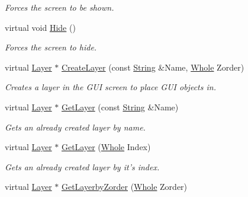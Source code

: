 \begin{DoxyCompactItemize}
\begin{DoxyCompactList}\small\item\em Forces the screen to be shown. \item\end{DoxyCompactList}\item 
\hypertarget{classphys_1_1UI_1_1Screen_acd02862f7386351b7536576dd21782fc}{
virtual void \hyperlink{classphys_1_1UI_1_1Screen_acd02862f7386351b7536576dd21782fc}{Hide} ()}
\label{classphys_1_1UI_1_1Screen_acd02862f7386351b7536576dd21782fc}

\begin{DoxyCompactList}\small\item\em Forces the screen to hide. \item\end{DoxyCompactList}\item 
virtual \hyperlink{classphys_1_1UI_1_1Layer}{Layer} $\ast$ \hyperlink{classphys_1_1UI_1_1Screen_ad3b73f039f840fd2b2dc20219c428e9d}{CreateLayer} (const \hyperlink{namespacephys_aa03900411993de7fbfec4789bc1d392e}{String} \&Name, \hyperlink{namespacephys_a460f6bc24c8dd347b05e0366ae34f34a}{Whole} Zorder)
\begin{DoxyCompactList}\small\item\em Creates a layer in the GUI screen to place GUI objects in. \item\end{DoxyCompactList}\item 
virtual \hyperlink{classphys_1_1UI_1_1Layer}{Layer} $\ast$ \hyperlink{classphys_1_1UI_1_1Screen_a4969b2e17fa22706046f5653c91a2e70}{GetLayer} (const \hyperlink{namespacephys_aa03900411993de7fbfec4789bc1d392e}{String} \&Name)
\begin{DoxyCompactList}\small\item\em Gets an already created layer by name. \item\end{DoxyCompactList}\item 
virtual \hyperlink{classphys_1_1UI_1_1Layer}{Layer} $\ast$ \hyperlink{classphys_1_1UI_1_1Screen_a7aa76ca0a45c7b78d1872388bf6da4dc}{GetLayer} (\hyperlink{namespacephys_a460f6bc24c8dd347b05e0366ae34f34a}{Whole} Index)
\begin{DoxyCompactList}\small\item\em Gets an already created layer by it's index. \item\end{DoxyCompactList}\item 
virtual \hyperlink{classphys_1_1UI_1_1Layer}{Layer} $\ast$ \hyperlink{classphys_1_1UI_1_1Screen_a206f87f758f708f297c0d6311ed4781e}{GetLayerbyZorder} (\hyperlink{namespacephys_a460f6bc24c8dd347b05e0366ae34f34a}{Whole} Zorder)

\end{DoxyCompactItemize}
